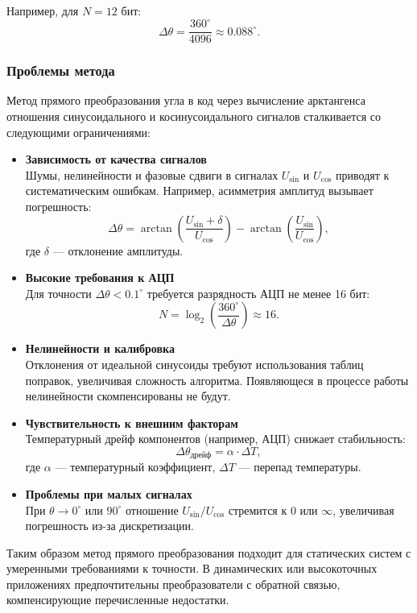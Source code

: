 Например, для \(N = 12\) бит:
\[
\Delta\theta = \frac{360^\circ}{4096} \approx 0.088^\circ.
\]

\subsubsection{Проблемы метода}
Метод прямого преобразования угла в код через вычисление арктангенса отношения синусоидального и косинусоидального сигналов сталкивается со следующими ограничениями:
\begin{itemize}
    \item \textbf{Зависимость от качества сигналов} \\
    Шумы, нелинейности и фазовые сдвиги в сигналах \( U_{\sin} \) и \( U_{\cos} \) приводят к систематическим ошибкам. Например, асимметрия амплитуд вызывает погрешность:
    \[
    \Delta\theta = \arctan\left(\frac{U_{\sin} + \delta}{U_{\cos}}\right) - \arctan\left(\frac{U_{\sin}}{U_{\cos}}\right),
    \]
    где \(\delta\) — отклонение амплитуды.

    \item \textbf{Высокие требования к АЦП} \\
    Для точности \(\Delta\theta < 0.1^\circ\) требуется разрядность АЦП не менее 16 бит:
    \[
    N = \log_2\left(\frac{360^\circ}{\Delta\theta}\right) \approx 16.
    \]

    \item \textbf{Нелинейности и калибровка} \\
    Отклонения от идеальной синусоиды требуют использования таблиц поправок, увеличивая сложность алгоритма. Появляющеся в процессе работы нелинейности скомпенсированы не будут.

    \item \textbf{Чувствительность к внешним факторам} \\
    Температурный дрейф компонентов (например, АЦП) снижает стабильность:
    \[
    \Delta\theta_{\text{дрейф}} = \alpha \cdot \Delta T,
    \]
    где \(\alpha\) — температурный коэффициент, \(\Delta T\) — перепад температуры.

    \item \textbf{Проблемы при малых сигналах} \\
    При \(\theta \to 0^\circ\) или \(90^\circ\) отношение \( U_{\sin}/U_{\cos} \) стремится к \(0\) или \(\infty\), увеличивая погрешность из-за дискретизации.
\end{itemize}

Таким образом метод прямого преобразования подходит для статических систем с умеренными требованиями к точности. 
В динамических или высокоточных приложениях предпочтительны преобразователи с обратной связью, компенсирующие перечисленные недостатки.

